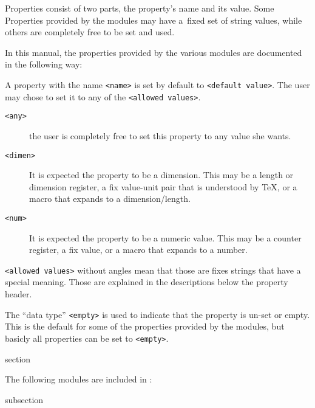 Properties consist of two parts, the property's name and its
value. Some Properties provided by the {\CoCoTeX} modules may have
a~fixed set of string values, while others are completely free to be
set and used.

In this manual, the properties provided by the various modules are
documented in the following way:

{\let\noindex\relax{}}

A property with the name \texttt{<name>} is set by default to
\texttt{<default value>}. The user may chose to set it to any of the
\texttt{<allowed values>}.
\begin{description}
\item[\texttt{<any>}]  the user is completely free to set this
  property to any value she wants.
\item[\texttt{<dimen>}] It is expected the property to be a
  dimension. This may be a length or dimension register, a fix
  value-unit pair that is understood by \TeX, or a macro that expands
  to a dimension/length.
\item[\texttt{<num>}] It is expected the property to be a numeric
  value. This may be a counter register, a fix value, or a macro that
  expands to a number.
\end{description}
\lstinline{<allowed values>} without angles mean that those are fixes
strings that have a special meaning. Those are explained in the
descriptions below the property header.

The “data type” \texttt{<empty>} is used to indicate that the property
is un-set or empty. This is the default for some of the properties
provided by the {\CoCoTeX} modules, but basicly all properties can
be set to \texttt{<empty>}.


\begin{heading}{section}
\end{heading}

The following modules are included in {\CoCoTeX}:

\begin{heading}{subsection}
\end{heading}

